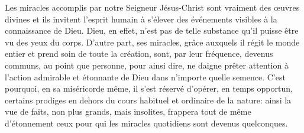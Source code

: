 Les miracles accomplis par notre Seigneur Jésus-Christ
		sont vraiment des œuvres divines
	et ils invitent l’esprit humain à s’élever
		des événements visibles à la connaissance de Dieu.
Dieu, en effet, n’est pas de telle substance
	qu’il puisse être vu des yeux du corps.
D’autre part, ses miracles,
	grâce auxquels il régit le monde entier et prend soin de toute la création,
	sont, par leur fréquence, devenus communs,
	au point que personne, pour ainsi dire, ne daigne prêter attention
	à l’action admirable et étonnante de Dieu dans n’importe quelle semence.
C’est pourquoi, en sa miséricorde même,
	il s’est réservé d’opérer, en temps opportun,
	certains prodiges en dehors du cours habituel et ordinaire de la nature:
	ainsi la vue de faits, non plus grands, mais insolites,
	frappera tout de même d’étonnement
		ceux pour qui les miracles quotidiens sont devenus quelconques.
